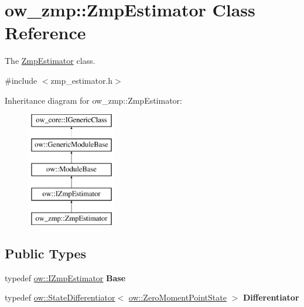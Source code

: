 \hypertarget{classow__zmp_1_1ZmpEstimator}{}\section{ow\+\_\+zmp\+:\+:Zmp\+Estimator Class Reference}
\label{classow__zmp_1_1ZmpEstimator}


The \hyperlink{classow__zmp_1_1ZmpEstimator}{Zmp\+Estimator} class.  




{\ttfamily \#include $<$zmp\+\_\+estimator.\+h$>$}

Inheritance diagram for ow\+\_\+zmp\+:\+:Zmp\+Estimator\+:\begin{figure}[H]
\begin{center}
\leavevmode
\includegraphics[height=5.000000cm]{de/d28/classow__zmp_1_1ZmpEstimator}
\end{center}
\end{figure}
\subsection*{Public Types}
\begin{DoxyCompactItemize}
\item 
typedef \hyperlink{classow_1_1IZmpEstimator}{ow\+::\+I\+Zmp\+Estimator} {\bfseries Base}\hypertarget{classow__zmp_1_1ZmpEstimator_aa7ba1bd99f675206642d3d7fc9d29210}{}\label{classow__zmp_1_1ZmpEstimator_aa7ba1bd99f675206642d3d7fc9d29210}

\item 
typedef \hyperlink{classow__core_1_1StateDifferentiator}{ow\+::\+State\+Differentiator}$<$ \hyperlink{classow__core_1_1ZeroMomentPointState}{ow\+::\+Zero\+Moment\+Point\+State} $>$ {\bfseries Differentiator}\hypertarget{classow__zmp_1_1ZmpEstimator_a4261ae4a14ffde93505bb2913e0f7b2a}{}\label{classow__zmp_1_1ZmpEstimator_a4261ae4a14ffde93505bb2913e0f7b2a}

\end{DoxyCompactItemize}
